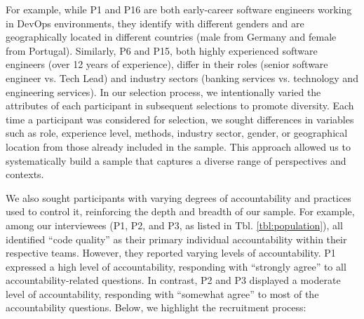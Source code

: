 For example, while P1 and P16 are both early-career software engineers working in DevOps environments, they identify with different genders and are geographically located in different countries (male from Germany and female from Portugal). Similarly, P6 and P15, both highly experienced software engineers (over 12 years of experience), differ in their roles (senior software engineer vs. Tech Lead) and industry sectors (banking services vs. technology and engineering services). In our selection process, we intentionally varied the attributes of each participant in subsequent selections to promote diversity. Each time a participant was considered for selection, we sought differences in variables such as role, experience level, methods, industry sector, gender, or geographical location from those already included in the sample. This approach allowed us to systematically build a sample that captures a diverse range of perspectives and contexts.

We also sought participants with varying degrees of accountability and practices used to control it, reinforcing the depth and breadth of our sample. For example, among our interviewees (P1, P2, and P3, as listed in Tbl. \ref{tbl:population}), all identified ``code quality'' as their primary individual accountability within their respective teams. However, they reported varying levels of accountability. P1 expressed a high level of accountability, responding with ``strongly agree'' to all accountability-related questions. In contrast, P2 and P3 displayed a moderate level of accountability, responding with ``somewhat agree'' to most of the accountability questions. Below, we highlight the recruitment process:

